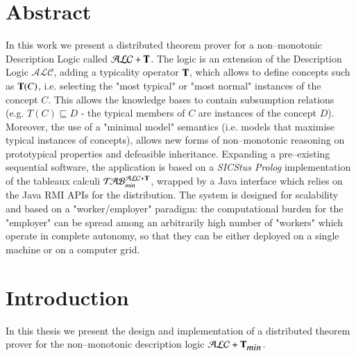 \documentclass[a4paper, 11pt, oneside]{elsarticle}
\newcommand{\tip}{{\bf T}}
\newcommand{\alc}{\mathcal{ALC}}
\newcommand{\alct}{\mathcal{ALC}+\tip}
\newcommand{\alctmin}{\mathcal{ALC}+\tip_{\mbox{\em min}}}
\newcommand{\nuovoc}{\mathrel{{\mathcal{T}\!\mathcal{AB}}}_{min}^{\mathcal{ALC}+\mbox{\scriptsize $\tip$}}}
\begin{document}

\section*{Abstract}

In this work we present a distributed theorem prover for a non--monotonic Description Logic called $\alct$.
The logic is an extension of the Description Logic $\alc$, adding a typicality operator $\tip$, which allows to define concepts such as $\tip(C)$, i.e. selecting the "most typical" or "most normal" instances of the concept $C$. This allows the knowledge bases to contain subsumption relations (e.g. $T(C) \sqsubseteq D$ - the typical members of $C$ are instances of the concept $D$). Moreover, the use of a "minimal model" semantics (i.e. models that maximise typical instances of concepts), allows new forms of non--monotonic reasoning on prototypical properties and defeasible inheritance.
Expanding a pre--existing sequential software, the application is based on a \emph{SICStus Prolog} implementation of the tableaux calculi $\nuovoc$, wrapped by a Java interface which relies on the Java RMI APIs for the distribution.
The system is designed for scalability and based on a "worker/employer" paradigm: the computational burden for the "employer" can be spread among an arbitrarily high number of "workers" which operate in complete autonomy, so that they can be either deployed on a single machine or on a computer grid.

\newpage


\tableofcontents

\newpage


\section{Introduction}

In this thesis we present the design and implementation of a distributed theorem prover for the non--monotonic description logic $\alctmin$.
\end{document}
